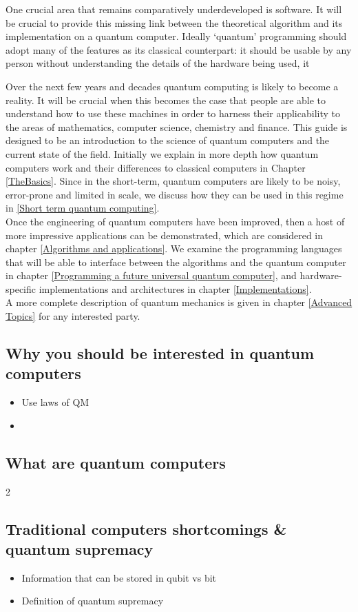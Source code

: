 One crucial area that remains comparatively underdeveloped is software. It will be crucial to provide this missing link between the theoretical algorithm and its implementation on a quantum computer. Ideally `quantum' programming should adopt many of the features as its classical counterpart: it should be usable by any person without understanding the details of the hardware being used, it 


Over the next few years and decades quantum computing is likely to become a reality. It will be crucial when this becomes the case that people are able to understand how to use these machines in order to harness their applicability to the areas of mathematics, computer science, chemistry and finance. This guide is designed to be an introduction to the science of quantum computers and the current state of the field. Initially we explain in more depth how quantum computers work and their differences to classical computers in Chapter \autoref{TheBasics}. Since in the short-term, quantum computers are likely to be noisy, error-prone and limited in scale, we discuss how they can be used in this regime in \autoref{Short term quantum computing}. \\

Once the engineering of quantum computers have been improved, then a host of more impressive applications can be demonstrated, which are considered in chapter \autoref{Algorithms and applications}. We examine the programming languages that will be able to interface between the algorithms and the quantum computer in chapter \autoref{Programming a future universal quantum computer}, and hardware-specific implementations and architectures in chapter \autoref{Implementations}. \\

A more complete description of quantum mechanics is given in chapter \autoref{Advanced Topics} for any interested party. 

\subsection{Why you should be interested in quantum computers}
\begin{itemize}
\item Use laws of QM
\item 
\end{itemize}


\subsection{What are quantum computers}
2

\subsection{Traditional computers shortcomings \& quantum supremacy}
\begin{itemize}
\item Information that can be stored in qubit vs bit
\item Definition of quantum supremacy
\end{itemize}
